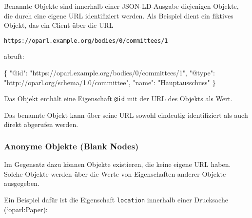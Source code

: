\documentclass[,a4paper]{article}
\newenvironment{Shaded}{}{}
\newcommand{\DataTypeTok}[1]{\textcolor[rgb]{0.56,0.13,0.00}{{#1}}}
\newcommand{\StringTok}[1]{\textcolor[rgb]{0.25,0.44,0.63}{{#1}}}
\newcommand{\FunctionTok}[1]{\textcolor[rgb]{0.02,0.16,0.49}{{#1}}}
\begin{document}

Benannte Objekte sind innerhalb einer JSON-LD-Ausgabe diejenigen
Objekte, die durch eine eigene URL identifiziert werden. Als Beispiel
dient ein fiktives Objekt, das ein Client über die URL

\begin{verbatim}
https://oparl.example.org/bodies/0/committees/1
\end{verbatim}

abruft:

\begin{Shaded}
\begin{Highlighting}[]
\FunctionTok{\{}
    \DataTypeTok{"@id"}\FunctionTok{:} \StringTok{"https://oparl.example.org/bodies/0/committees/1"}\FunctionTok{,}
    \DataTypeTok{"@type"}\FunctionTok{:} \StringTok{"http://oparl.org/schema/1.0/committee"}\FunctionTok{,}
    \DataTypeTok{"name"}\FunctionTok{:} \StringTok{"Hauptausschuss"}
\FunctionTok{\}}
\end{Highlighting}
\end{Shaded}

Das Objekt enthält eine Eigenschaft \texttt{@id} mit der URL des Objekts
als Wert.

Das benannte Objekt kann über seine URL sowohl eindeutig identifiziert
als auch direkt abgerufen werden.

\subsubsection{Anonyme Objekte (Blank Nodes)}\label{anonymeux5fobjekte}

Im Gegensatz dazu können Objekte existieren, die keine eigene URL haben.
Solche Objekte werden über die Werte von Eigenschaften anderer Objekte
ausgegeben.

Ein Beispiel dafür ist die Eigenschaft \texttt{location} innerhalb einer
Drucksache (`oparl:Paper):
\end{document}
